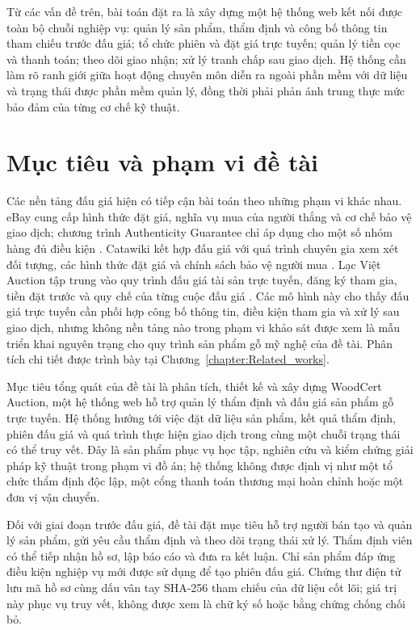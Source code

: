 \documentclass[../DoAn.tex]{subfiles}
\begin{document}
Từ các vấn đề trên, bài toán đặt ra là xây dựng một hệ thống web kết nối được toàn bộ chuỗi nghiệp vụ: quản lý sản phẩm, thẩm định và công bố thông tin tham chiếu trước đấu giá; tổ chức phiên và đặt giá trực tuyến; quản lý tiền cọc và thanh toán; theo dõi giao nhận; xử lý tranh chấp sau giao dịch. Hệ thống cần làm rõ ranh giới giữa hoạt động chuyên môn diễn ra ngoài phần mềm với dữ liệu và trạng thái được phần mềm quản lý, đồng thời phải phản ánh trung thực mức bảo đảm của từng cơ chế kỹ thuật.

\section{Mục tiêu và phạm vi đề tài}
\label{section:1.2}

Các nền tảng đấu giá hiện có tiếp cận bài toán theo những phạm vi khác nhau. eBay cung cấp hình thức đặt giá, nghĩa vụ mua của người thắng và cơ chế bảo vệ giao dịch; chương trình Authenticity Guarantee chỉ áp dụng cho một số nhóm hàng đủ điều kiện \cite{ebay-bidding,ebay-authenticity-guarantee,ebay-money-back-guarantee}. Catawiki kết hợp đấu giá với quá trình chuyên gia xem xét đối tượng, các hình thức đặt giá và chính sách bảo vệ người mua \cite{catawiki-experts,catawiki-bid-types,catawiki-safe-secure}. Lạc Việt Auction tập trung vào quy trình đấu giá tài sản trực tuyến, đăng ký tham gia, tiền đặt trước và quy chế của từng cuộc đấu giá \cite{lacviet-user-guide,lacviet-auction-regulation}. Các mô hình này cho thấy đấu giá trực tuyến cần phối hợp công bố thông tin, điều kiện tham gia và xử lý sau giao dịch, nhưng không nền tảng nào trong phạm vi khảo sát được xem là mẫu triển khai nguyên trạng cho quy trình sản phẩm gỗ mỹ nghệ của đề tài. Phân tích chi tiết được trình bày tại Chương~\ref{chapter:Related_works}.

Mục tiêu tổng quát của đề tài là phân tích, thiết kế và xây dựng WoodCert Auction, một hệ thống web hỗ trợ quản lý thẩm định và đấu giá sản phẩm gỗ trực tuyến. Hệ thống hướng tới việc đặt dữ liệu sản phẩm, kết quả thẩm định, phiên đấu giá và quá trình thực hiện giao dịch trong cùng một chuỗi trạng thái có thể truy vết. Đây là sản phẩm phục vụ học tập, nghiên cứu và kiểm chứng giải pháp kỹ thuật trong phạm vi đồ án; hệ thống không được định vị như một tổ chức thẩm định độc lập, một cổng thanh toán thương mại hoàn chỉnh hoặc một đơn vị vận chuyển.

Đối với giai đoạn trước đấu giá, đề tài đặt mục tiêu hỗ trợ người bán tạo và quản lý sản phẩm, gửi yêu cầu thẩm định và theo dõi trạng thái xử lý. Thẩm định viên có thể tiếp nhận hồ sơ, lập báo cáo và đưa ra kết luận. Chỉ sản phẩm đáp ứng điều kiện nghiệp vụ mới được sử dụng để tạo phiên đấu giá. Chứng thư điện tử lưu mã hồ sơ cùng dấu vân tay SHA-256 tham chiếu của dữ liệu cốt lõi; giá trị này phục vụ truy vết, không được xem là chữ ký số hoặc bằng chứng chống chối bỏ.
\end{document}
